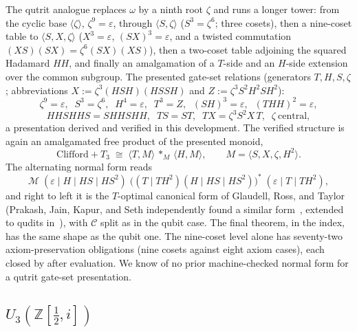 The qutrit analogue replaces $\omega$ by a ninth root $\zeta$ and runs a
longer tower: from the cyclic base $\langle \zeta \rangle$,
$\zeta^9 = \varepsilon$, through
$\langle S, \zeta \rangle$ ($S^3 = \zeta^6$; three cosets), then a
nine-coset table to $\langle S, X, \zeta \rangle$
($X^3 = \varepsilon$, $(SX)^3 = \varepsilon$, and a twisted commutation
$(XS)(SX) = \zeta^6 (SX)(XS)$), then a two-coset table adjoining the
squared Hadamard $H\!H$, and finally an amalgamation of a $T$-side and an
$H$-side extension over the common subgroup.  The presented gate-set
relations (generators $T, H, S, \zeta$; abbreviations
$X := \zeta^3 (HSH)(HSSH)$ and $Z := \zeta^3 S^2 H^2 S H^2$):
\[
  \zeta^9 = \varepsilon,\;\;
  S^3 = \zeta^6,\;\;
  H^4 = \varepsilon,\;\;
  T^3 = Z,\;\;
  (SH)^3 = \varepsilon,\;\;
  (THH)^2 = \varepsilon,
\]
\[
  HHSHHS = SHHSHH,\;\;
  TS = ST,\;\;
  TX = \zeta^3 S^2 X\, T,\;\;
  \zeta\ \text{central},
\]
a presentation derived and verified in this development.  The verified
structure is again an amalgamated free product of the presented monoid,
\[
  \mathrm{Clifford}{+}T_3 \;\cong\;
  \langle T, M \rangle \,\ast_{M}\, \langle H, M \rangle,
  \qquad M = \langle S, X, \zeta, H^2 \rangle.
\]
The alternating normal form reads
\[
  \mathcal{M}\;(\varepsilon \mid H \mid HS \mid HS^2)\;
  \bigl((T \mid TH^2)(H \mid HS \mid HS^2)\bigr)^{*}\;
  (\varepsilon \mid T \mid TH^2),
\]
and right to left it is the $T$-optimal canonical form of Glaudell,
Ross, and Taylor~\cite{glaudell2019qutrit}
(Prakash, Jain, Kapur, and Seth independently found a similar
form~\cite{prakash2018qutrit}, extended to qudits
in~\cite{jain2020qudit}), with $\mathcal{C}$ split as in the qubit
case.  The final theorem,  in the
index, has the same shape as the qubit one.  The nine-coset level alone
has seventy-two axiom-preservation obligations (nine cosets against eight
axiom cases), each closed by  after evaluation.  We know of no prior
machine-checked normal form for a qutrit gate-set presentation.

\subsection{\texorpdfstring{$U_3(\mathbb{Z}[\tfrac12,i])$}{U3(Z[1/2,i])}}\label{sec:u3}

